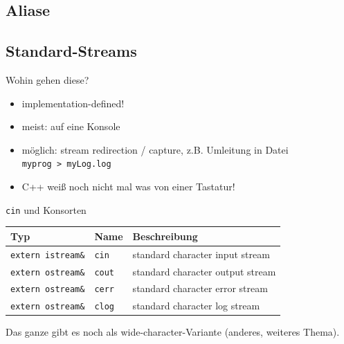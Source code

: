 \subsection{Aliase}



\subsection{Standard-Streams}

\begin{frame}{Wohin gehen diese?}
	\begin{itemize}
		\item implementation-defined!
		\item meist: auf eine Konsole
		\item möglich: stream redirection / capture, z.B. Umleitung in Datei \texttt{myprog~>~myLog.log}
		\item C++ weiß noch nicht mal was von einer Tastatur!
	\end{itemize}
\end{frame}

\begin{frame}{\texttt{cin} und Konsorten}
	\begin{tabular}{l|l|l}
		\textbf{Typ}	&	\textbf{Name}	& \textbf{Beschreibung}	\\
		\hline
		\texttt{extern istream\&}	&	\texttt{cin}	&	standard character input stream	\\
		\texttt{extern ostream\&}	&	\texttt{cout}	&	standard character output stream	\\
		\texttt{extern ostream\&}	&	\texttt{cerr}	&	standard character error stream	\\
		\texttt{extern ostream\&}	&	\texttt{clog}	&	standard character log stream	\\
	\end{tabular}
	
	\vspace{2em}
	
	Das ganze gibt es noch als wide-character-Variante (anderes, weiteres Thema).
\end{frame}
